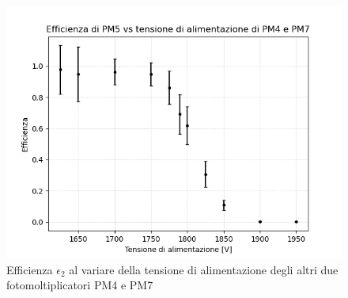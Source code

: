 \documentclass{article}
\begin{document}
\begin{figure}[h!]
\begin{center}
\includegraphics[scale=0.7]{Grafici/epsilon_vs_alimentazione_altri.png}
\caption{Efficienza $\epsilon_2$ al variare della tensione di alimentazione degli altri due fotomoltiplicatori PM4 e PM7} \label{facc}
\end{center}
\end{figure}

\newpage 
\end{document}

